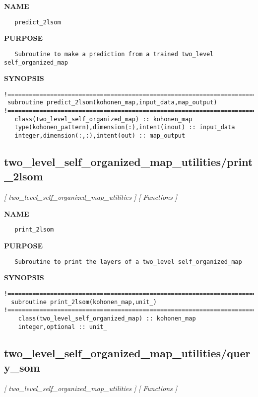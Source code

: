 \documentclass{article}
\begin{document}
\label{ch:robo73}
\label{ch:two_level_self_organized_map_utilities_predict_2lsom}
\textbf{NAME}
\begin{verbatim}
   predict_2lsom
\end{verbatim}
\textbf{PURPOSE}
\begin{verbatim}
   Subroutine to make a prediction from a trained two_level self_organized_map 
\end{verbatim}
\textbf{SYNOPSIS}
\begin{verbatim}
!========================================================================================
 subroutine predict_2lsom(kohonen_map,input_data,map_output)
!========================================================================================
   class(two_level_self_organized_map) :: kohonen_map
   type(kohonen_pattern),dimension(:),intent(inout) :: input_data
   integer,dimension(:,:),intent(out) :: map_output
\end{verbatim}
\newpage
\subsection{two\_level\_self\_organized\_map\_utilities/print\_2lsom}
\textsl{[ two\_level\_self\_organized\_map\_utilities ]}
\textsl{[ Functions ]}

\label{ch:robo74}
\label{ch:two_level_self_organized_map_utilities_print_2lsom}
\textbf{NAME}
\begin{verbatim}
   print_2lsom
\end{verbatim}
\textbf{PURPOSE}
\begin{verbatim}
   Subroutine to print the layers of a two_level self_organized_map 
\end{verbatim}
\textbf{SYNOPSIS}
\begin{verbatim}
!========================================================================================
  subroutine print_2lsom(kohonen_map,unit_)
!========================================================================================
    class(two_level_self_organized_map) :: kohonen_map
    integer,optional :: unit_
\end{verbatim}
\newpage
\subsection{two\_level\_self\_organized\_map\_utilities/query\_som}
\textsl{[ two\_level\_self\_organized\_map\_utilities ]}
\textsl{[ Functions ]}
\end{document}
